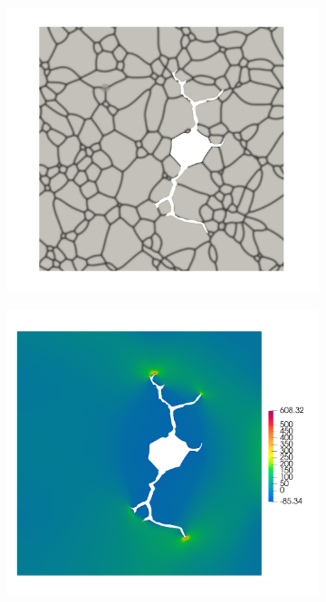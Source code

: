\begin{frame}
\begin{columns}[T]
\begin{column}{0.4\textwidth}
\begin{figure}
        \begin{subfigure}[t]{0.47\linewidth}
          \centering
          \includegraphics[width=0.9\linewidth]{Chapter345/figures/partial_hbs_3}
        \end{subfigure}
        \begin{subfigure}[t]{0.47\linewidth}
          \centering
          \includegraphics[width=0.9\linewidth]{Chapter345/figures/partial_hbs_3_stress}
        \end{subfigure}
      \end{figure}

\end{column}
\end{columns}
\end{frame}
